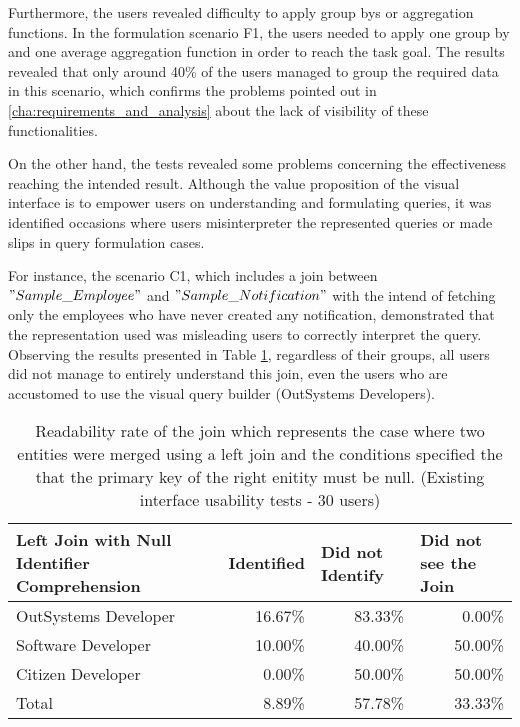 Furthermore, the users revealed difficulty to apply group bys or aggregation functions. In the formulation scenario F1, the users needed to apply one group by and one average aggregation function in order to reach the task goal. The results revealed that only around 40\% of the users managed to group the required data in this scenario, which confirms the problems pointed out in \ref{cha:requirements_and_analysis} about the lack of visibility of these functionalities.

On the other hand, the tests revealed some problems concerning the effectiveness reaching the intended result. Although the value proposition of the visual interface is to empower users on understanding and formulating queries, it was identified occasions where users misinterpreter the represented queries or made slips in query formulation cases.

For instance, the scenario C1, which includes a join between $"Sample\_Employee"$ and $"Sample\_Notification"$ with the intend of fetching only the employees who have never created any notification, demonstrated that the representation used was misleading users to correctly interpret the query. Observing the results presented in Table \ref{tab:existingInterfaceLeftJoinNull}, regardless of their groups, all users did not manage to entirely understand this join, even the users who are accustomed to use the visual query builder (OutSystems Developers).

\begin{table}[tb]
    \caption{Readability rate of the join which represents the case where two entities were merged using a left join and the conditions specified the that the primary key of the right enitity must be null. (Existing interface usability tests - 30 users)}
    \label{tab:existingInterfaceLeftJoinNull}
    \begin{tabular}{@{}m{5.4cm}rrr@{}}
    \toprule
    \textbf{Left Join with Null Identifier Comprehension} & \multicolumn{1}{l}{Identified} & \multicolumn{1}{l}{Did not Identify} & \multicolumn{1}{l}{Did not see the Join} \\ \midrule
    OutSystems Developer                                  & 16.67\%                        & 83.33\%                                & 0.00\%                                   \\
    Software Developer                                    & 10.00\%                        & 40.00\%                                & 50.00\%                                  \\
    Citizen Developer                                     & 0.00\%                         & 50.00\%                                & 50.00\%                                  \\
    Total                                                 & 8.89\%                         & 57.78\%                                & 33.33\%                                  \\ \bottomrule
    \end{tabular}
    \end{table}


